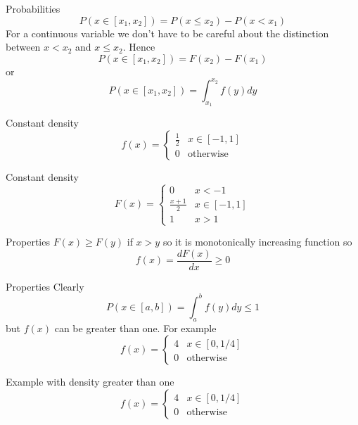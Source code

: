 \documentclass{beamer}
\newcommand{\crish}{\color{reddish}}
\newcommand{\cbla}{\color{black}}
\begin{document}
\begin{frame}{Probabilities}
\crish$$
P(x\in [x_1,x_2])=P(x\le x_2)-P(x<x_1)
$$\cbla{}
For a continuous variable we don't have to be careful about the
distinction between \crish$x<x_2$\cbla{}  and \crish$x\le x_2$\cbla{}. Hence
\crish$$
P(x\in [x_1,x_2])=F(x_2)-F(x_1)
$$\cbla{}
or
\crish$$
P(x\in [x_1,x_2])=\int_{x_1}^{x_2} f(y)dy
$$\cbla{}
\end{frame}

\begin{frame}{Constant density}
\crish$$
f(x)=\left\{\begin{array}{ll}\frac{1}{2}&x\in [-1,1]\\0&\mbox{otherwise}\end{array}\right.
$$\cbla{}
\begin{center}

\end{center}

\end{frame}


\begin{frame}{Constant density}
\crish$$
F(x)=\left\{\begin{array}{ll}0&x<-1\\
\frac{x+1}{2}&x\in [-1,1]\\1&x>1\end{array}\right.
$$\cbla{}

\begin{center}

\end{center}

\end{frame}

\begin{frame}{Properties}
  \crish$F(x)\ge F(y)$\cbla{} if \crish$x>y$\cbla{} so it is monotonically increasing function so
  \crish$$f(x)=\frac{dF(x)}{dx}\ge 0$$\cbla{}
\end{frame}

\begin{frame}{Properties}
  Clearly
\crish$$
  P(x\in [a,b])=\int_a^bf(y)dy\le 1
$$\cbla{}
  but \crish$f(x)$\cbla{} can be greater than one. For example
\crish$$
f(x)=\left\{\begin{array}{ll}4&x\in [0,1/4]\\0&\mbox{otherwise}\end{array}\right.
$$\cbla{}
\end{frame}
  

\begin{frame}{Example with density greater than one}
\crish$$
f(x)=\left\{\begin{array}{ll}4&x\in [0,1/4]\\0&\mbox{otherwise}\end{array}\right.
$$\cbla{}

\begin{center}

\end{center}

\end{frame}
\end{document}
